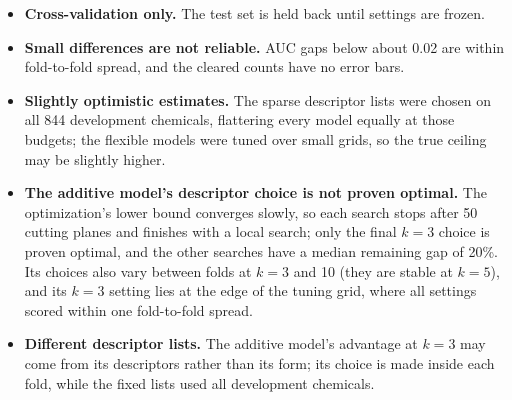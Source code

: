 \documentclass[11pt]{article}
\begin{document}
\begin{itemize}
  \item \textbf{Cross-validation only.} The test set is held back until settings are frozen.
  \item \textbf{Small differences are not reliable.} AUC gaps below about 0.02 are within
        fold-to-fold spread, and the cleared counts have no error bars.
  \item \textbf{Slightly optimistic estimates.} The sparse descriptor lists were chosen on all 844
        development chemicals, flattering every model equally at those budgets; the flexible models
        were tuned over small grids, so the true ceiling may be slightly higher.
  \item \textbf{The additive model's descriptor choice is not proven optimal.} The optimization's
        lower bound converges slowly, so each search stops after 50 cutting planes and finishes with
        a local search; only the final $k=3$ choice is proven optimal, and the other searches have
        a median remaining gap of 20\%. Its choices also vary between folds at $k=3$ and 10 (they
        are stable at $k=5$), and its $k=3$ setting lies at the edge of the tuning grid, where all
        settings scored within one fold-to-fold spread.
  \item \textbf{Different descriptor lists.} The additive model's advantage at $k=3$ may come from
        its descriptors rather than its form; its choice is made inside each fold, while the fixed
        lists used all development chemicals.
\end{itemize}
\end{document}
